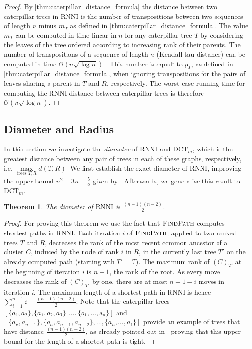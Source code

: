 \documentclass[11pt]{amsart}
\newtheorem{theorem}{Theorem}
\newcommand{\rnni}{\mathrm{RNNI}}
\newcommand{\findpath}{\textsc{FindPath}}
\newcommand{\dtt}{\mathrm{DCT}}
\renewcommand{\O}{\mathcal O}
\newcommand{\summary}[1]{} %
\begin{document}
\begin{proof}
	By \autoref{thm:caterpillar_distance_formula} the distance between two caterpillar trees in $\rnni$ is the number of transpositions between two sequences of length $n$ minus $m_T$ as defined in \autoref{thm:caterpillar_distance_formula}.
	The value $m_T$ can be computed in time linear in $n$ for any caterpillar tree $T$ by considering the leaves of the tree ordered according to increasing rank of their parents.
	The number of transpositions of a sequence of length $n$ (Kendall-tau distance) can be computed in time $\O(n \sqrt{\log n})$ \autocite{Chan2010-ls}.
	This number is equal` to $p_T$, as defined in \autoref{thm:caterpillar_distance_formula}, when ignoring transpositions for the pairs of leaves sharing a parent in $T$ and $R$, respectively.
	The worst-case running time for computing the $\rnni$ distance between caterpillar trees is therefore $\O(n \sqrt{\log n})$.
\end{proof}

\subsection{Diameter and Radius}

\label{section:diameter}
\summary{Definition of Diameter.}
In this section we  investigate the \emph{diameter} of $\rnni$ and $\dtt_m$, which is the greatest distance between any pair of trees in each of these graphs, respectively, i.e. $\max\limits_{\text{trees }T,R}d(T,R)$.
We first establish the exact diameter of $\rnni$, improving the upper bound $n^2 - 3n - \frac{5}{8}$ given by \textcite{Gavryushkin2018-ol}.
Afterwards, we generalise this result to $\dtt_m$.

\begin{theorem}
	The diameter of $\rnni$ is $\frac{(n-1)(n-2)}{2}$.
	\label{thm:diameter_rnni}
\end{theorem}

\begin{proof}
	For proving this theorem we use the fact that $\findpath$ computes shortest paths in $\rnni$.
	Each iteration $i$ of $\findpath$, applied to two ranked trees $T$ and $R$, decreases the rank of the most recent common ancestor of a cluster $C$, induced by the node of rank $i$ in $R$, in the currently last tree $T'$ on the already computed path (starting wth $T' = T$).
	The maximum rank of $(C)_{T'}$ at the beginning of iteration $i$ is $n-1$, the rank of the root.
	As every move decreases the rank of $(C)_{T'}$ by one, there are at most $n-1-i$ moves in iteration $i$.
	The maximum length of a shortest path in $\rnni$ is hence $\sum \limits_{i = 1}^{n-1} i = \frac{(n-1)(n-2)}{2}$.
	Note that the caterpillar trees $[\{a_1, a_2\}, \{a_1, a_2, a_3\}, \ldots, \{a_1, \ldots, a_n\}]$ and $[\{a_n, a_{n-1}\}, \{a_n, a_{n-1}, a_{n-2}\}, \ldots, \{a_n, \ldots, a_1\}]$ provide an example of trees that have distance $\frac{(n-1)(n-2)}{2}$, as already pointed out in \autocite[Corollary 1]{Collienne2020-iu}, proving that this upper bound for the length of a shortest path is tight.
\end{proof}
\end{document}

